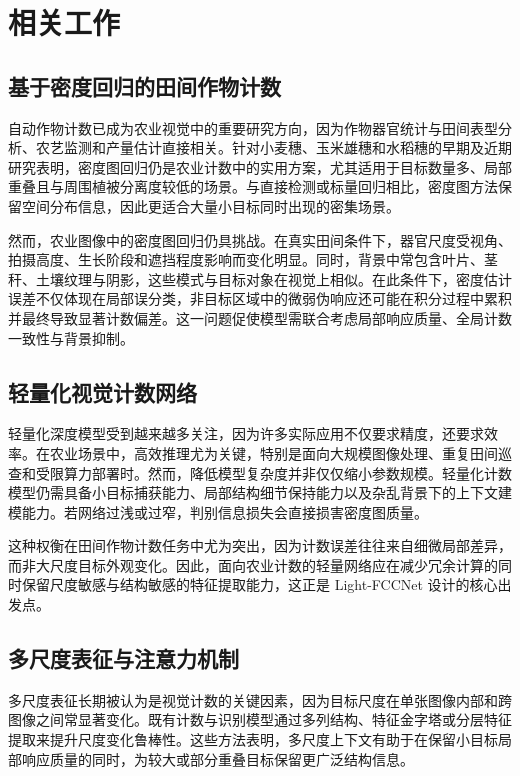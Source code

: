 \documentclass[a4paper,fleqn]{cas-sc}
\begin{document}
\section{相关工作}

\subsection{基于密度回归的田间作物计数}

自动作物计数已成为农业视觉中的重要研究方向，因为作物器官统计与田间表型分析、农艺监测和产量估计直接相关。针对小麦穗、玉米雄穗和水稻穗的早期及近期研究表明，密度图回归仍是农业计数中的实用方案，尤其适用于目标数量多、局部重叠且与周围植被分离度较低的场景。与直接检测或标量回归相比，密度图方法保留空间分布信息，因此更适合大量小目标同时出现的密集场景。

然而，农业图像中的密度图回归仍具挑战。在真实田间条件下，器官尺度受视角、拍摄高度、生长阶段和遮挡程度影响而变化明显。同时，背景中常包含叶片、茎秆、土壤纹理与阴影，这些模式与目标对象在视觉上相似。在此条件下，密度估计误差不仅体现在局部误分类，非目标区域中的微弱伪响应还可能在积分过程中累积并最终导致显著计数偏差。这一问题促使模型需联合考虑局部响应质量、全局计数一致性与背景抑制。

\subsection{轻量化视觉计数网络}

轻量化深度模型受到越来越多关注，因为许多实际应用不仅要求精度，还要求效率。在农业场景中，高效推理尤为关键，特别是面向大规模图像处理、重复田间巡查和受限算力部署时。然而，降低模型复杂度并非仅仅缩小参数规模。轻量化计数模型仍需具备小目标捕获能力、局部结构细节保持能力以及杂乱背景下的上下文建模能力。若网络过浅或过窄，判别信息损失会直接损害密度图质量。

这种权衡在田间作物计数任务中尤为突出，因为计数误差往往来自细微局部差异，而非大尺度目标外观变化。因此，面向农业计数的轻量网络应在减少冗余计算的同时保留尺度敏感与结构敏感的特征提取能力，这正是 Light-FCCNet 设计的核心出发点。

\subsection{多尺度表征与注意力机制}

多尺度表征长期被认为是视觉计数的关键因素，因为目标尺度在单张图像内部和跨图像之间常显著变化。既有计数与识别模型通过多列结构、特征金字塔或分层特征提取来提升尺度变化鲁棒性。这些方法表明，多尺度上下文有助于在保留小目标局部响应质量的同时，为较大或部分重叠目标保留更广泛结构信息。
\end{document}
